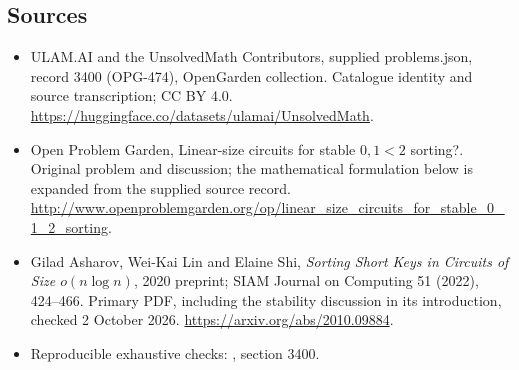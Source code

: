 \documentclass[11pt,a4paper]{article}
\begin{document}
\subsection{Sources}
\begin{itemize}
\item[S1] ULAM.AI and the UnsolvedMath Contributors, supplied problems.json, record 3400 (OPG-474), OpenGarden collection. Catalogue identity and source transcription; CC BY 4.0.
\url{https://huggingface.co/datasets/ulamai/UnsolvedMath}.
\item[S2] Open Problem Garden, Linear-size circuits for stable $0,1 < 2$ sorting?. Original problem and discussion; the mathematical formulation below is expanded from the supplied source record.
\url{http://www.openproblemgarden.org/op/linear_size_circuits_for_stable_0_1_2_sorting}.

\item[R1] Gilad Asharov, Wei-Kai Lin and Elaine Shi, \emph{Sorting
Short Keys in Circuits of Size $o(n\log n)$}, 2020 preprint; SIAM
Journal on Computing 51 (2022), 424--466. Primary PDF, including the
stability discussion in its introduction, checked 2 October 2026.
\url{https://arxiv.org/abs/2010.09884}.
\item[R2] Reproducible exhaustive checks:
, section 3400.

\end{itemize}
\end{document}
